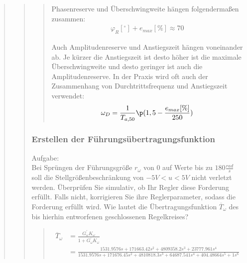 \begin{quote}
\begin{quote}
\begin{quote}
            
            \vspace{2em}
            Phasenreserve und Überschwingweite hängen folgendermaßen zusammen:\\
            \begin{equation*}
                \begin{split}
                \varphi_R [^\circ] + e_{max} [\%] \approx 70
                \end{split}
            \end{equation*}
            
            \vspace{1em}
            Auch Amplitudenreserve und Anstiegszeit hängen voneinander ab. Je kürzer die Anstiegszeit ist desto
            höher ist die maximale Überschwingweite und desto geringer ist auch die Amplitudenreserve. In
            der Praxis wird oft auch der Zusammenhang von Durchtrittsfrequenz und Anstiegszeit
            verwendet:
            \begin{equation*}
            \begin{split}
                \omega_D = \frac{1}{T_{a,50}} \p (1,5- \frac{e_{max} [\%]}{250})
            \end{split}
            \end{equation*}
            \cite{krachler}
        \end{quote}

        
        \subsubsection{Erstellen der Führungsübertragungsfunktion}
        Aufgabe:\\
        Bei Sprüngen der Führungsgröße $r_\omega$ von $0$ auf Werte bis zu $180 \frac{rad}{s}$ soll die
        Stellgrößenbeschränkung von $−5V < u < 5V$ nicht verletzt werden. Überprüfen Sie simulativ, ob Ihr Regler
        diese Forderung erfüllt. Falls nicht, korrigieren Sie ihre Reglerparameter, sodass die Forderung erfüllt wird.
        Wie lautet die Übertragungsfunktion $\overline{T}_\omega$ des bis hierhin entworfenen geschlossenen
        Regelkreises?
        \begin{quote}
            \begin{equation*}
            	\begin{split}
            		\overline{T}_\omega &= \frac{G_\omega^{'} K_\omega}{1 + G_\omega^{'} K_\omega}\\
            		&= \frac{1531.9576s +  171663.42s^2 +  4809358.2s^3 +  23777.961s^4}{1531.9576s +  171676.45s^2 + 
            		4810818.3s^3 +  64687.541s^4 +  404.48664s^5 +  1s^6}
            	\end{split}
            \end{equation*}
        \end{quote}
        

\end{quote}
\end{quote}
